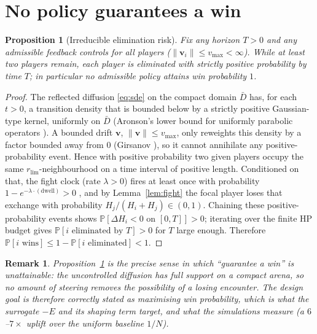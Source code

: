 \documentclass[11pt]{article}
\newtheorem{proposition}[theorem]{Proposition}
\newtheorem*{remark}{Remark}
\newcommand{\Prob}{\mathbb{P}}
\newcommand{\rlim}{r_{\mathrm{lim}}}
\newcommand{\vmax}{v_{\max}}
\newcommand{\vv}{\mathbf{v}}
\begin{document}
\newpage
\section{No policy guarantees a win}\label{sec:noguarantee}

\begin{proposition}[Irreducible elimination risk]\label{prop:noguarantee}
Fix any horizon $T>0$ and any admissible feedback controls for all players
($\|\vv_i\|\le\vmax<\infty$). While at least two players remain, each player is
eliminated with strictly positive probability by time $T$; in particular no
admissible policy attains win probability $1$.
\end{proposition}

\begin{proof}
The reflected diffusion \eqref{eq:sde} on the compact domain $\bar D$ has, for
each $t>0$, a transition density that is bounded below by a strictly positive
Gaussian-type kernel, uniformly on $\bar D$ (Aronson's lower bound for uniformly
parabolic operators \cite{Aronson}). A bounded drift $\vv$, $\|\vv\|\le\vmax$,
only reweights this density by a factor bounded away from $0$ (Girsanov
\cite{KaratzasShreve}), so it cannot annihilate any positive-probability event.
Hence with positive probability two given players occupy the same
$\rlim$-neighbourhood on a time interval of positive length. Conditioned on that,
the fight clock (rate $\lambda>0$) fires at least once with probability
$1-e^{-\lambda\cdot(\text{dwell})}>0$ \cite{Kingman}, and by Lemma~\ref{lem:fight}
the focal player loses that exchange with probability
$H_j/(H_i+H_j)\in(0,1)$. Chaining these positive-probability events shows
$\Prob[\Delta H_i<0 \text{ on }[0,T]]>0$; iterating over the finite HP budget gives
$\Prob[\text{$i$ eliminated by }T]>0$ for $T$ large enough. Therefore
$\Prob[i\text{ wins}]\le 1-\Prob[i\text{ eliminated}]<1$.
\end{proof}

\begin{remark}
Proposition~\ref{prop:noguarantee} is the precise sense in which ``guarantee a
win'' is unattainable: the uncontrolled diffusion has full support on a compact
arena, so no amount of steering removes the possibility of a losing encounter.
The design goal is therefore correctly stated as \emph{maximising win
probability}, which is what the surrogate $-E$ and its shaping term target, and
what the simulations measure (a $6$--$7\times$ uplift over the uniform baseline
$1/N$).
\end{remark}
\end{document}
